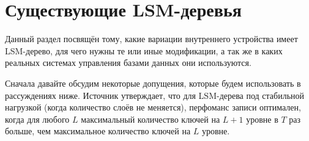 \section {Существующие LSM-деревья}

Данный раздел посвящён тому, какие вариации внутреннего устройства имеет LSM-дерево, для чего нужны те или иные модификации, а так же в каких реальных системах управления базами данных они используются. 

Сначала давайте обсудим некоторые допущения, которые будем использовать в рассуждениях ниже.
Источник \cite{luo2020lsm} утверждает, что для LSM-дерева под стабильной нагрузкой (когда количество слоёв не меняется), перфоманс записи оптимален, когда для любого $L$ максимальный количество ключей на $L + 1$ уровне в $T$ раз больше, чем максимальное количество ключей на $L$ уровне. 



